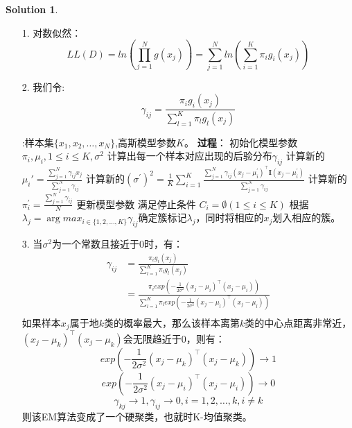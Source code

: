 \documentclass[a4paper,UTF8]{article}
\theoremstyle{definition}
\newtheorem*{solution}{Solution}
\begin{document}
\begin{solution}
	\begin{enumerate}

		\item [1.]
		      对数似然：
		      \[LL(D) = ln(\prod\limits_{j=1}^N g(x_j)) = \sum\limits_{j=1}^N ln(\sum\limits_{i=1}^K\pi_i g_i(x_j))\]
		\item [2.]
		      我们令:
		      \[\gamma_{ij} = \frac{\pi_i g_i(x_j)}{\sum\limits_{l=1}^K\pi_l g_l(x_j)}\]
		      \begin{algorithm}[H]
			      \begin{algorithmic}
				      \REQUIRE:样本集$\{x_1,x_2,\ldots,x_N\}$,高斯模型参数$K$。
				      \STATE\textbf{过程}：
				      \STATE 初始化模型参数$\pi_i,\mu_i,1\le i\le K,\sigma^2$
				      \REPEAT
				      \STATE 计算出每一个样本对应出现的后验分布$\gamma_{ij}$
				      \ENDFOR
				      \STATE 计算新的$\mu_i{\prime} = \frac{\sum_{j=1}^N\gamma_{ij}x_j}{\sum_{j=1}^N\gamma_{ij}}$
				      \STATE 计算新的$(\sigma^{\prime})^2 = \frac{1}{K}\sum_{i=1}^K\frac{\sum_{j=1}^N\gamma_{ij}(x_j-\mu_i^{\prime})^{\top}\mathbf{I}(x_j-\mu_i^{\prime})}{\sum_{j=1}^N\gamma_{ij}}$
				      \STATE 计算新的$\pi_i^{\prime} = \frac{\sum_{j=1}^{N}\gamma_{ij}}{N}$
				      \ENDFOR
				      \STATE 更新模型参数
				      \UNTIL 满足停止条件
				      \STATE $C_i=\emptyset(1\le i\le K)$
				      \STATE 根据$\lambda_j=\arg max_{i\in\{1,2,\ldots,K\}} \gamma_{ij}$确定簇标记$\lambda_j$，同时将相应的$x_j$划入相应的簇。
				      \ENDFOR
			      \end{algorithmic}
		      \end{algorithm}
		\item [3.]
		      当$\sigma^2$为一个常数且接近于0时，有：
		      \begin{align*}
			      \gamma_{ij} & = \frac{\pi_i g_i(x_j)}{\sum\limits_{l=1}^K\pi_l g_l(x_j)}                                                                                      \\
			                  & = \frac{\pi_i exp(-\frac{1}{2\sigma^2}(x_j-\mu_i)^{\top}(x_j-\mu_i))}{\sum_{l=1}^K\pi_l exp(-\frac{1}{2\sigma^2}(x_j-\mu_l)^{\top}(x_j-\mu_l))} \\
		      \end{align*}
		      如果样本$x_j$属于地$k$类的概率最大，那么该样本离第$k$类的中心点距离非常近，$(x_j-\mu_k)^{\top}(x_j-\mu_k)$会无限趋近于0，则有：
		      \[exp(-\frac{1}{2\sigma^2}(x_j-\mu_k)^{\top}(x_j-\mu_k))\rightarrow 1\]
		      \[exp(-\frac{1}{2\sigma^2}(x_j-\mu_i)^{\top}(x_j-\mu_i))\rightarrow 0\]
		      \[\gamma_{kj}\rightarrow 1,\gamma_{ij}\rightarrow 0,i=1,2,\ldots,k,i\neq k\]
		      则该EM算法变成了一个硬聚类，也就时K-均值聚类。
	\end{enumerate}
\end{solution}
\end{document}

